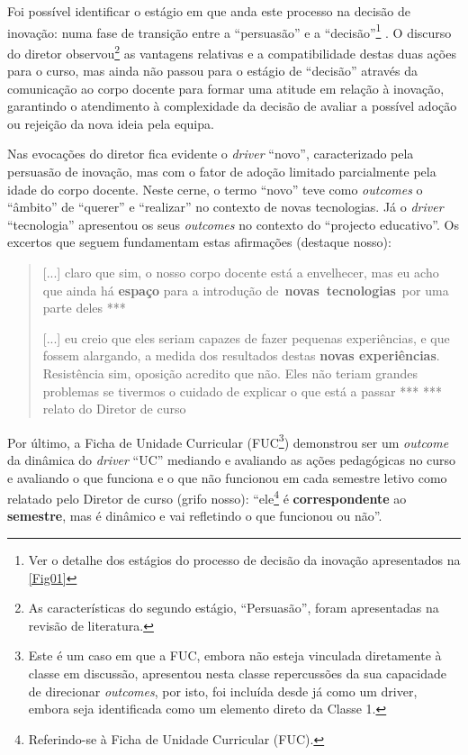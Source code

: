 \documentclass{textolivre-html}
\begin{document}
Foi possível identificar o estágio em que anda este processo na decisão de inovação: numa fase de transição entre a “persuasão” e a “decisão”\footnote{Ver o detalhe dos estágios do processo de decisão da inovação apresentados na \cref{Fig01}} \cite{rogers1983}. O discurso do diretor observou\footnote{As características do segundo estágio, “Persuasão”, foram apresentadas na revisão de literatura.} as vantagens relativas e a compatibilidade destas duas ações para o curso, mas ainda não passou para o estágio de “decisão” através da comunicação ao corpo docente para formar uma atitude em relação à inovação, garantindo o atendimento à complexidade da decisão de avaliar a possível adoção ou rejeição da nova ideia pela equipa.

Nas evocações do diretor fica evidente o \textit{driver} “novo”, caracterizado pela persuasão de inovação, mas com o fator de adoção limitado parcialmente pela idade do corpo docente. Neste cerne, o termo “novo” teve como \textit{outcomes} o “âmbito” de “querer” e “realizar” no contexto de novas tecnologias. Já o \textit{driver} “tecnologia” apresentou os seus \textit{outcomes} no contexto do “projecto educativo”. Os excertos que seguem fundamentam estas afirmações (destaque nosso):

\begin{quote}
[...] claro que sim, o nosso corpo docente está a envelhecer, mas eu acho que ainda há \textbf{espaço} para a introdução de \textbf{novas tecnologias} por uma parte deles ***

[...] eu creio que eles seriam capazes de fazer pequenas experiências, e que fossem alargando, a medida dos resultados destas \textbf{novas experiências}. Resistência sim, oposição acredito que não. Eles não teriam grandes problemas se tivermos o cuidado de explicar o que está a passar ***
*** relato do Diretor de curso
\end{quote}

Por último, a Ficha de Unidade Curricular (FUC\footnote{Este é um caso em que a FUC, embora não esteja vinculada diretamente à classe em discussão, apresentou nesta classe repercussões da sua capacidade de direcionar \textit{outcomes}, por isto, foi incluída desde já como um driver, embora seja identificada como um elemento direto da Classe 1.}) demonstrou ser um \textit{outcome} da dinâmica do \textit{driver} “UC” mediando e avaliando as ações pedagógicas no curso e avaliando o que funciona e o que não funcionou em cada semestre letivo como relatado pelo Diretor de curso (grifo nosso): “ele\footnote{Referindo-se à Ficha de Unidade Curricular (FUC).} é \textbf{correspondente} ao \textbf{semestre}, mas é dinâmico e vai refletindo o que funcionou ou não”.
\end{document}
